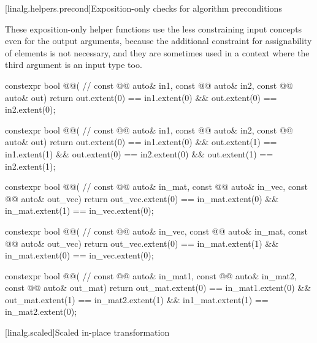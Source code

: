 [linalg.helpers.precond]{Exposition-only checks for algorithm preconditions}

\pnum
\begin{note}
These exposition-only helper functions use
the less constraining input concepts even for the output arguments,
because the additional constraint for assignability of elements
is not necessary, and
they are sometimes used in a context
where the third argument is an input type too.
\end{note}

\begin{codeblock}
constexpr bool @@(                                          // \expos
  const @@ auto& in1, const @@ auto& in2, const @@ auto& out) {
  return out.extent(0) == in1.extent(0) && out.extent(0) == in2.extent(0);
}

constexpr bool @@(                                          // \expos
  const @@ auto& in1,  const @@ auto& in2, const @@ auto& out) {
  return out.extent(0) == in1.extent(0) && out.extent(1) == in1.extent(1) &&
         out.extent(0) == in2.extent(0) && out.extent(1) == in2.extent(1);
}

constexpr bool @@(                                     // \expos
  const @@ auto& in_mat, const @@ auto& in_vec, const @@ auto& out_vec) {
  return out_vec.extent(0) == in_mat.extent(0) && in_mat.extent(1) == in_vec.extent(0);
}

constexpr bool @@( // \expos
  const @@ auto& in_vec, const @@ auto& in_mat, const @@ auto& out_vec) {
  return out_vec.extent(0) == in_mat.extent(1) && in_mat.extent(0) == in_vec.extent(0);
}

constexpr bool @@(                                     // \expos
  const @@ auto& in_mat1, const @@ auto& in_mat2, const @@ auto& out_mat) {
  return out_mat.extent(0) == in_mat1.extent(0) && out_mat.extent(1) == in_mat2.extent(1) &&
         in1_mat.extent(1) == in_mat2.extent(0);
}
\end{codeblock}

[linalg.scaled]{Scaled in-place transformation}

